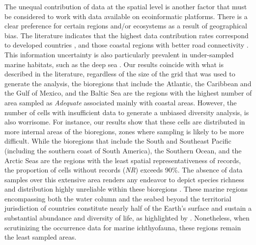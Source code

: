 \documentclass[12pt,authoryear]{elsarticle}
\begin{document}
The unequal contribution of data at the spatial level is another factor that must be considered to work with data available on ecoinformatic platforms. There is a clear preference for certain regions and/or ecosystems as a result of geographical bias. The literature indicates that the highest data contribution rates correspond to developed countries \citep{yesson2007,chandler2017}, and those coastal regions with better road connectivity \citep{chandler2017,melo2020}. This information uncertainty is also particularly prevalent in under-sampled marine habitats, such as the deep sea \citep{webb2010}. Our results coincide with what is described in the literature, regardless of the size of the grid that was used to generate the analysis, the bioregions that include the Atlantic, the Caribbean and the Gulf of Mexico, and the Baltic Sea are the regions with the highest number of area sampled as \textit{Adequate} associated mainly with coastal areas.
However, the number of cells with insufficient data to generate a unbiased diversity analysis, is also worrisome. For instance, our results show that these cells are distributed in more internal areas of the bioregions, zones where sampling is likely to be more difficult.
While the bioregions that include the South and Southeast Pacific (including the southern coast of South America), the Southern Ocean, and the Arctic Seas are the regions with the least spatial representativeness of records, the proportion of cells without records (\textit{NR}) exceeds 90\%.
The absence of data samples over this extensive area renders any endeavor to depict species richness and distribution highly unreliable within these bioregions  \citep[as noted by][]{yang2013geographical, troia2017}. These marine regions encompassing both the water column and the seabed beyond the territorial jurisdiction of countries constitute nearly half of the Earth's surface and sustain a substantial abundance and diversity of life, as highlighted by \citep{visalli2020}. Nonetheless, when scrutinizing the occurrence data for marine ichthyofauna, these regions remain the least sampled areas.
\end{document}
